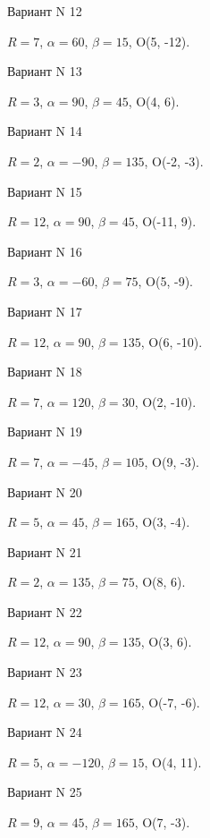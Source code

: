 \documentclass[11pt]{report}
\begin{document}
Вариант N 12

$R = 7$, $\alpha = 60$, $\beta = 15$, O(5, -12).



Вариант N 13

$R = 3$, $\alpha = 90$, $\beta = 45$, O(4, 6).



Вариант N 14

$R = 2$, $\alpha = -90$, $\beta = 135$, O(-2, -3).



Вариант N 15

$R = 12$, $\alpha = 90$, $\beta = 45$, O(-11, 9).



Вариант N 16

$R = 3$, $\alpha = -60$, $\beta = 75$, O(5, -9).



Вариант N 17

$R = 12$, $\alpha = 90$, $\beta = 135$, O(6, -10).



Вариант N 18

$R = 7$, $\alpha = 120$, $\beta = 30$, O(2, -10).



Вариант N 19

$R = 7$, $\alpha = -45$, $\beta = 105$, O(9, -3).



Вариант N 20

$R = 5$, $\alpha = 45$, $\beta = 165$, O(3, -4).



Вариант N 21

$R = 2$, $\alpha = 135$, $\beta = 75$, O(8, 6).



Вариант N 22

$R = 12$, $\alpha = 90$, $\beta = 135$, O(3, 6).



Вариант N 23

$R = 12$, $\alpha = 30$, $\beta = 165$, O(-7, -6).



Вариант N 24

$R = 5$, $\alpha = -120$, $\beta = 15$, O(4, 11).



Вариант N 25

$R = 9$, $\alpha = 45$, $\beta = 165$, O(7, -3).
\end{document}
